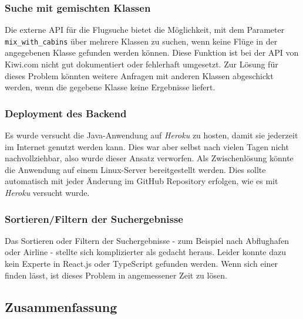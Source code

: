 \documentclass[12pt,twoside,a4paper]{article}
\begin{document}
\subsubsection{Suche mit gemischten Klassen}\label{sec:mixed-classes}
Die externe API für die Flugsuche bietet die Möglichkeit, mit dem Parameter \texttt{mix\_with\_cabins} über mehrere Klassen zu suchen, wenn keine Flüge in der angegebenen Klasse gefunden werden können. Diese Funktion ist bei der API von Kiwi.com nicht gut dokumentiert oder fehlerhaft umgesetzt. Zur Lösung für dieses Problem könnten weitere Anfragen mit anderen Klassen abgeschickt werden, wenn die gegebene Klasse keine Ergebnisse liefert.
\subsubsection{Deployment des Backend}
Es wurde versucht die Java-Anwendung auf \textit{Heroku} zu hosten, damit sie jederzeit im Internet genutzt werden kann. Dies war aber selbst nach vielen Tagen nicht nachvollziehbar, also wurde dieser Ansatz verworfen. Als Zwischenlösung könnte die Anwendung auf einem Linux-Server bereitgestellt werden. Dies sollte automatisch mit jeder Änderung im GitHub Repository erfolgen, wie es mit \textit{Heroku} versucht wurde.
\subsubsection{Sortieren/Filtern der Suchergebnisse}
Das Sortieren oder Filtern der Suchergebnisse - zum Beispiel nach Abflughafen oder Airline - stellte sich komplizierter als gedacht heraus. Leider konnte dazu kein Experte in React.js oder TypeScript gefunden werden. Wenn sich einer finden lässt, ist dieses Problem in angemessener Zeit zu lösen.
\subsection{Zusammenfassung}
\newpage


\end{document}
